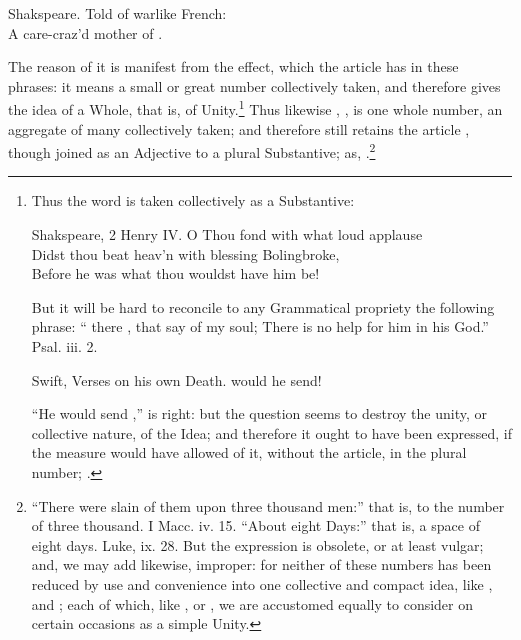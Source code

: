 \begin{aquote}{Shakspeare.}
  Told of  warlike French:\\
  A care-craz'd mother of .
\end{aquote}

The reason of it is manifest from the effect, which the article has in
these phrases: it means a small or great number collectively taken, and
therefore gives the idea of a Whole, that is, of Unity.\footnote{Thus
  the word  is taken collectively as a Substantive:

  \begin{aquote}{Shakspeare, 2 Henry IV.}
    O Thou fond  with what loud applause\\
    Didst thou beat heav'n with blessing Bolingbroke,\\
    Before he was what thou wouldst have him be!
  \end{aquote}

  But it will be hard to reconcile to any Grammatical propriety the
  following phrase: `` there , that say of my soul;
  There is no help for him in his God.'' Psal. iii. 2.

  \begin{aquote}{Swift, Verses on his own Death.}
     would he send!
  \end{aquote}

  ``He would send ,'' is right: but the question
   seems to destroy the unity, or collective nature, of the
  Idea; and therefore it ought to have been expressed, if the measure
  would have allowed of it, without the article, in the plural number;
  .} Thus likewise , , is one whole number, an aggregate of many collectively
taken; and therefore still retains the article , though joined as
an Adjective to a plural Substantive; as, .\footnote{``There were slain of them upon  three thousand
men:'' that is, to the number of three thousand. I Macc. iv. 15. ``About
 eight Days:'' that is, a space of eight days. Luke, ix. 28. But
the expression is obsolete, or at least vulgar; and, we may add
likewise, improper: for neither of these numbers has been reduced by use
and convenience into one collective and compact idea, like , and ; each of which, like , or
, we are accustomed equally to consider on certain occasions
as a simple Unity.}

